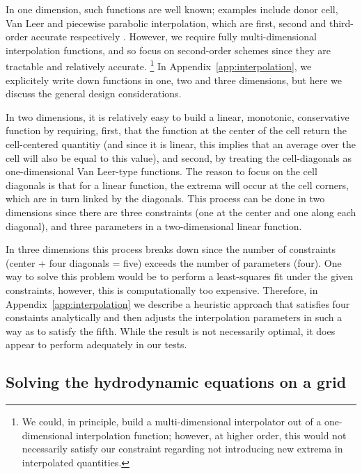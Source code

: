 In one dimension, such functions are well known; examples include
donor cell, Van Leer and piecewise parabolic interpolation, which are
first, second and third-order accurate respectively
\citep[e.g.,][]{Stone92a}.  However, we require fully
multi-dimensional interpolation functions, and so focus on
second-order schemes since they are tractable and relatively accurate.
\footnote{We could, in principle, build a multi-dimensional
  interpolator out of a one-dimensional interpolation function;
  however, at higher order, this would not necessarily satisfy our
  constraint regarding not introducing new extrema in interpolated quantities.}  In Appendix~\ref{app:interpolation}, we
explicitely write down functions in one, two and three dimensions, but
here we discuss the general design considerations.

In two dimensions, it is relatively easy to build a linear, monotonic,
conservative function by requiring, first, that the function at the
center of the cell return the cell-centered quantitiy (and since it is
linear, this implies that an average over the cell will also be equal
to this value), and second, by treating the cell-diagonals as
one-dimensional Van Leer-type functions.  The reason to focus on the
cell diagonals is that for a linear function, the extrema will occur at the cell 
corners, which are in turn linked by the diagonals.  This process can be done in
two dimensions since there are three constraints (one at the center and one along
each diagonal), and three parameters in a two-dimensional linear
function.

In three dimensions this process breaks down since the number of
constraints (center + four diagonals = five) exceeds the number of
parameters (four).  One way to solve this problem would be to perform
a least-squares fit under the given constraints, however, this is
computationally too expensive.  Therefore, in Appendix~\ref{app:interpolation} we describe
a heuristic approach that satisfies four constaints analytically and
then adjusts the interpolation parameters in such a way as to satisfy the fifth.
While the result is not necessarily optimal, it does appear to perform
adequately in our tests.


\subsection{Solving the hydrodynamic equations on a grid}
\label{sec:solve_hydro}

